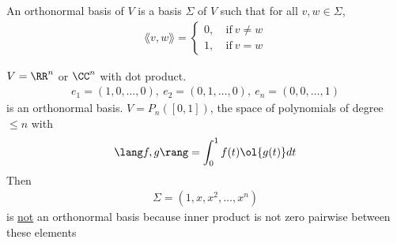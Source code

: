 \documentclass[class=scrartcl, crop=false]{standalone}
\begin{document}
\begin{definition}
  An orthonormal basis of $V$ is a basis $\Sigma$ of $V$ such that for all $v, w \in \Sigma$, 
  \begin{gather*}
    \lang v, w \rang = 
    \begin{cases}
      0, & \ \text{if} \ v \neq w \\
      1, & \ \text{if} \ v = w
    \end{cases} 
  \end{gather*} 
\end{definition}  
\begin{example}
  \begin{enumerate}
    \ii[]
    \ii
    $V = \RR^n$ or $\CC^n$ with dot product. 
    \begin{gather*}
      e_1 = (1, 0, \dots, 0), \ e_2 = (0, 1, \dots, 0), \ e_n = (0, 0, \dots, 1)
    \end{gather*} 
    is an orthonormal basis.
    \ii
    $V = P_n([0, 1])$, the space of polynomials of degree $\leq n$ with 
    \begin{gather*}
      \lang f, g \rang = \int_0^1 f(t) \ol{g(t)} dt
    \end{gather*} 
    Then
    \begin{gather*}
      \Sigma = (1, x, x^2, \dots, x^n)
    \end{gather*} 
    is \ul{not} an orthonormal basis because inner product is not zero pairwise between these elements
  \end{enumerate} 
\end{example} 
\end{document}
